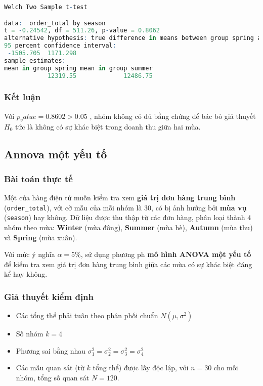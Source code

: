 \begin{lstlisting}[language=R, caption= Kết quả t-test]
		Welch Two Sample t-test

data:  order_total by season
t = -0.24542, df = 511.26, p-value = 0.8062
alternative hypothesis: true difference in means between group spring and group summer is not equal to 0
95 percent confidence interval:
 -1505.705  1171.298
sample estimates:
mean in group spring mean in group summer 
            12319.55             12486.75 
\end{lstlisting}

\subsubsection{Kết luận}
\begin{boxH}

Với $p_value = 0.8602 > 0.05$ , nhóm không có đủ bằng chứng để bác bỏ giả thuyết $H_0$ tức là không có sự khác biệt trong doanh thu giữa hai mùa.

\end{boxH}
\subsection{Annova một yếu tố}

\subsubsection{Bài toán thực tế}
Một cửa hàng điện tử muốn kiểm tra xem \textbf{giá trị đơn hàng trung bình} (\texttt{order\_total}), với cỡ mẫu của mỗi nhóm là $30$, có bị ảnh hưởng bởi \textbf{mùa vụ} (\texttt{season}) hay không.  
Dữ liệu được thu thập từ các đơn hàng, phân loại thành $4$ nhóm theo mùa: \textbf{Winter} (mùa đông), \textbf{Summer} (mùa hè), \textbf{Autumn} (mùa thu) và \textbf{Spring} (mùa xuân).  

Với mức ý nghĩa $\alpha = 5\%$, sử dụng phương ph \textbf{mô hình ANOVA một yếu tố} để kiểm tra xem giá trị đơn hàng trung bình giữa các mùa có sự khác biệt đáng kể hay không.
\subsubsection{Giả thuyết kiểm định}

\begin{itemize}
  \item Các tổng thể phải tuân theo phân phối chuẩn $N(\mu, \sigma^2)$
  \item Số nhóm $k=4$
  \item Phương sai bằng nhau $\sigma_1^2 = \sigma_2^2 = \sigma_3^2 = \sigma_4^2$
  \item Các mẫu quan sát (từ $k$ tổng thể) được lấy độc lập, với $n = 30$ cho mỗi nhóm, tổng số quan sát $N = 120$.
\end{itemize}

